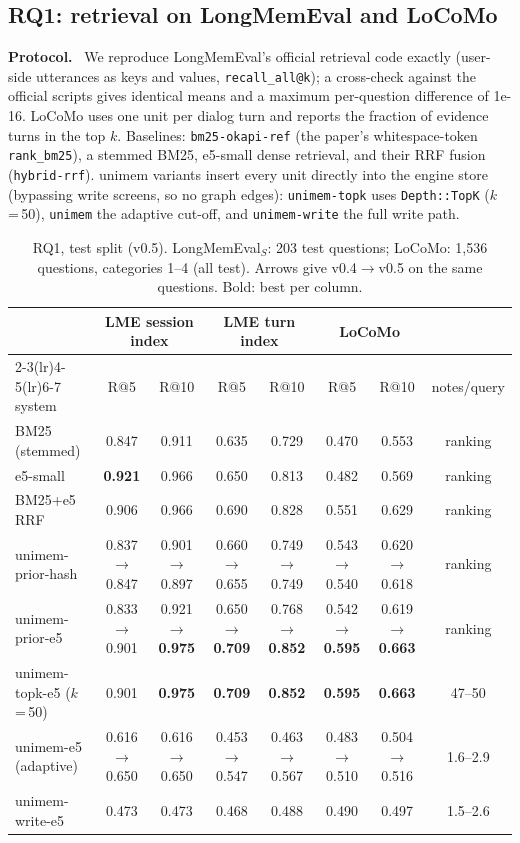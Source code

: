 \documentclass[10pt,twocolumn]{article}
\newcommand{\sys}{\textsf{unimem}}
\newcommand{\code}[1]{\texttt{\small #1}}
\newcommand{\para}[1]{\smallskip\noindent\textbf{#1}\ }
\begin{document}
\subsection{RQ1: retrieval on LongMemEval and LoCoMo}
\label{sec:rq1}

\para{Protocol.} We reproduce LongMemEval's official retrieval code exactly (user-side utterances as keys and values,
\code{recall\_all@k}); a cross-check against the official scripts gives identical means and a maximum per-question
difference of 1e-16. LoCoMo uses one unit per dialog turn and reports the fraction of evidence turns in the top $k$.
Baselines: \code{bm25-okapi-ref} (the paper's whitespace-token \code{rank\_bm25}), a stemmed BM25, e5-small dense
retrieval, and their RRF fusion (\code{hybrid-rrf}). \sys{} variants insert every unit directly into the engine store
(bypassing write screens, so no graph edges): \code{unimem-topk} uses \code{Depth::TopK} ($k$\,=\,50),
\code{unimem} the adaptive cut-off, and \code{unimem-write} the full write path.

\begin{table}[t]
\centering\small
\caption{RQ1, test split (v0.5). LongMemEval$_S$: 203 test questions; LoCoMo: 1,536 questions, categories 1--4 (all test).
Arrows give v0.4$\to$v0.5 on the same questions. Bold: best per column.}
\label{tab:std}
\setlength{\tabcolsep}{4pt}
\begin{tabular}{@{}lccccccc@{}}
\toprule
& \multicolumn{2}{c}{LME session index} & \multicolumn{2}{c}{LME turn index} & \multicolumn{2}{c}{LoCoMo} & \\
\cmidrule(lr){2-3}\cmidrule(lr){4-5}\cmidrule(lr){6-7}
system & R@5 & R@10 & R@5 & R@10 & R@5 & R@10 & notes/query \\
\midrule
BM25 (stemmed) & 0.847 & 0.911 & 0.635 & 0.729 & 0.470 & 0.553 & ranking \\
e5-small & \textbf{0.921} & 0.966 & 0.650 & 0.813 & 0.482 & 0.569 & ranking \\
BM25+e5 RRF & 0.906 & 0.966 & 0.690 & 0.828 & 0.551 & 0.629 & ranking \\
\midrule
unimem-prior-hash & 0.837$\to$0.847 & 0.901$\to$0.897 & 0.660$\to$0.655 & 0.749$\to$0.749 & 0.543$\to$0.540 & 0.620$\to$0.618 & ranking \\
unimem-prior-e5 & 0.833$\to$0.901 & 0.921$\to$\textbf{0.975} & 0.650$\to$\textbf{0.709} & 0.768$\to$\textbf{0.852} & 0.542$\to$\textbf{0.595} & 0.619$\to$\textbf{0.663} & ranking \\
unimem-topk-e5 ($k$\,=\,50) & 0.901 & \textbf{0.975} & \textbf{0.709} & \textbf{0.852} & \textbf{0.595} & \textbf{0.663} & 47--50 \\
unimem-e5 (adaptive) & 0.616$\to$0.650 & 0.616$\to$0.650 & 0.453$\to$0.547 & 0.463$\to$0.567 & 0.483$\to$0.510 & 0.504$\to$0.516 & 1.6--2.9 \\
unimem-write-e5 & 0.473 & 0.473 & 0.468 & 0.488 & 0.490 & 0.497 & 1.5--2.6 \\
\bottomrule
\end{tabular}
\end{table}
\end{document}

